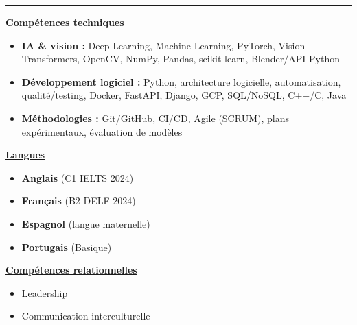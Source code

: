 \documentclass[letterpaper,10pt]{article}
\begin{document}
  

\vspace{4pt}
\noindent\rule{\textwidth}{0.4pt}
\vspace{0.4pt}

\noindent
\begin{minipage}[t]{0.39\textwidth}
  \raggedright
  \textbf{\underline{Compétences techniques}}\\[-2pt]
  {\scriptsize
    \begin{itemize}[leftmargin=*,itemsep=1pt,parsep=0pt,topsep=0pt,partopsep=0pt]
      \item \textbf{IA \& vision :} Deep Learning, Machine Learning, PyTorch, Vision Transformers, OpenCV, NumPy, Pandas, scikit-learn, Blender/API Python
      \item \textbf{Développement logiciel :} Python, architecture logicielle, automatisation, qualité/testing, Docker, FastAPI, Django, GCP, SQL/NoSQL, C++/C, Java
      \item \textbf{Méthodologies :} Git/GitHub, CI/CD, Agile (SCRUM), plans expérimentaux, évaluation de modèles
    \end{itemize}
  }
\end{minipage}\hfill
\begin{minipage}[t]{0.28\textwidth}
  \raggedright
  \textbf{\underline{Langues}}\\[-2pt]
  {\scriptsize
    \begin{itemize}[leftmargin=*,itemsep=0pt,parsep=0pt,topsep=0pt,partopsep=0pt]
      \item \textbf{Anglais} (C1 \textendash{} IELTS 2024)
      \item \textbf{Français} (B2 \textendash{} DELF 2024)
      \item \textbf{Espagnol} (langue maternelle)
      \item \textbf{Portugais} (Basique)
    \end{itemize}
  }

  \vspace{0.12cm}
  \textbf{\underline{Compétences relationnelles}}\\[-2pt]
  {\scriptsize
    \begin{itemize}[leftmargin=*,itemsep=1pt,parsep=0pt,topsep=0pt,partopsep=0pt]
      \item Leadership
      \item Communication interculturelle
    \end{itemize}
  }
\end{minipage}\hfill
\end{document}
